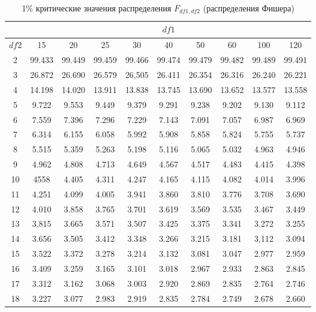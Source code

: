 \documentclass[12pt]{article}
\begin{document}
\begin{table}
\caption{1\% критические значения распределения $F_{df1,df2}$
(распределения Фишера) }
\begin{center}
{\footnotesize
\begin{tabular}{|c|c|c|c|c|c|c|c|c|c|}
  \hline
 & \multicolumn{9}{|c|}{$df1$} \\ \hline
$df2$ & 15 & 20 & 25 & 30 & 40&  50&  60 & 100& 120\\ \hline  \hline
2 & 99.433 &99.449  &99.459 &99.466 &99.474 &99.479 &99.482 &99.489 &99.491\\
3 & 26.872  &26.690  &26.579  &26,505 &26.411 &26.354  &26.316 &26.240&  26.221\\
4 & 14.198  &14.020  &13.911  &13.838 &13.745 &13.690 &13.652 &13.577 &13.558\\
5 & 9.722   &9.553  &9.449  &9.379 &9.291 &9.238 &9.202 &9.130 &9.112\\
6 & 7.559 &7.396  &7.296  &7.229  &7.143 &7.091 &7.057 &6.987 &6.969\\
7 & 6.314 &6.155 &6.058   &5.992   &5.908 &5.858 &5.824 &5.755 &5.737\\
8 & 5.515 &5.359 &5.263 &5.198  &5.116 &5.065 &5.032 &4.963 &4.946\\
9 & 4.962 &4.808 &4.713 &4.649 &4.567 &4.517 &4.483 &4.415 &4.398\\
10 & 4558 &4.405 &4.311 &4.247 &4.165 &4.115 &4.082 &4.014 &3.996\\
11 & 4.251 &4.099 &4.005 &3.941 &3.860 &3.810 &3.776 &3.708 &3.690\\
12 & 4.010 &3.858 &3.765 &3.701 &3.619 &3.569 &3.535 &3.467 &3.449\\
13 & 3.815 &3.665 &3.571 &3.507 &3.425 &3.375 &3.341 &3.272 &3.255\\
14 & 3.656 &3.505 &3.412 &3.348 &3.266 &3.215 &3.181 &3,112 &3.094\\
15 & 3.522 &3.372 &3.278 &3.214 &3.132 &3.081 &3.047 &2.977 &2.959\\
16 & 3.409 &3.259 &3.165 &3.101 &3.018 &2.967 &2.933 &2.863 &2.845\\
17 & 3.312 &3.162 &3.068 &3.003 &2.920 &2.869 &2.835 &2.764 &2.746\\
18 & 3.227 &3.077 &2.983 &2.919 &2.835 &2.784 &2.749 &2.678 &2.660\\

\end{tabular}}
\end{center}
\end{table}
\end{document}

